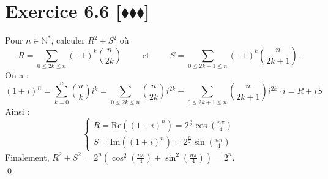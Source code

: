 \documentclass[10pt]{article}
\begin{document}

\section*{Exercice 6.6 [$\blacklozenge\blacklozenge\blacklozenge$]}
\begin{tcolorbox}[enhanced, width=7in, center, size=fbox, fontupper=\large, drop shadow southwest]
    Pour $n\in\mathbb{N}^*$, calculer $R^2+S^2$ où
    \begin{equation*}
        R = \sum_{0\leq 2k \leq n}{(-1)^k\binom{n}{2k}} \hspace{1cm} \text{et} \hspace{1cm} S = \sum_{0 \leq 2k+1 \leq n}{(-1)^k\binom{n}{2k+1}}.
    \end{equation*}
    On a :
    \begin{equation*}
        (1+i)^n = \sum_{k=0}^n{\binom{n}{k}i^k}=\sum_{0 \leq 2k \leq n}{\binom{n}{2k}i^{2k}}+\sum_{0\leq 2k+1 \leq n}{\binom{n}{2k+1}i^{2k}\cdot i}=R+iS
    \end{equation*}
    Ainsi :
    \begin{equation*}
        \begin{cases}
            R = \text{Re}\left((1+i)^n\right)=2^\frac{n}{2}\cos(\frac{n\pi}{4})\\
            S = \text{Im}\left((1+i)^n\right)=2^\frac{n}{2}\sin(\frac{n\pi}{4})
        \end{cases}
    \end{equation*}
    Finalement, $R^2 + S^2$ = $2^n(\cos^2(\frac{n\pi}{4})+\sin^2(\frac{n\pi}{4}))=2^n$.\\\qed
\end{tcolorbox}

\end{document}
